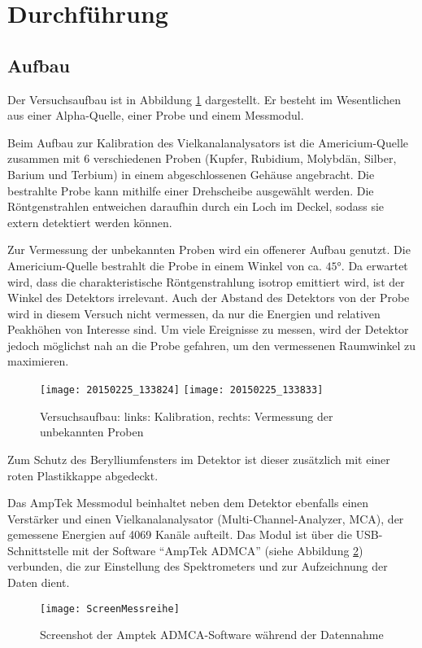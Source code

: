 \documentclass{../Misc/MontavonLaTeX/Montavon}
\newcommand{\halfwidth}{0.48\textwidth}
\newcommand{\fullwidth}{1.0\textwidth}
\begin{document}
\section{Durchführung}
\subsection{Aufbau}
Der Versuchsaufbau ist in Abbildung \ref{fig:Aufbau} dargestellt. 
Er besteht im Wesentlichen aus einer  Alpha-Quelle, einer Probe und einem Messmodul.

Beim Aufbau zur Kalibration des Vielkanalanalysators ist die Americium-Quelle zusammen mit 6 verschiedenen Proben (Kupfer, Rubidium, Molybdän, Silber, Barium und Terbium) in einem abgeschlossenen Gehäuse angebracht. Die bestrahlte Probe kann mithilfe einer Drehscheibe ausgewählt werden. Die Röntgenstrahlen entweichen daraufhin durch ein Loch im Deckel, sodass sie extern detektiert werden können.

Zur Vermessung der unbekannten Proben wird ein offenerer Aufbau genutzt. Die Americium-Quelle bestrahlt die Probe in einem Winkel von ca. $45 \unit{\degree}$. Da erwartet wird, dass die charakteristische Röntgenstrahlung isotrop emittiert wird, ist der Winkel des Detektors irrelevant. Auch der Abstand des Detektors von der Probe wird in diesem Versuch nicht vermessen, da nur die Energien und relativen Peakhöhen von Interesse sind. Um viele Ereignisse zu messen, wird der Detektor jedoch möglichst nah an die Probe gefahren, um den vermessenen Raumwinkel zu maximieren.

\begin{figure}[h]
\centering
\texttt{[image: 20150225\_133824]}
\texttt{[image: 20150225\_133833]}
\caption{Versuchsaufbau: links: Kalibration, rechts: Vermessung der unbekannten Proben}
\label{fig:Aufbau}
\end{figure}

Zum Schutz des Berylliumfensters im Detektor ist dieser zusätzlich mit einer roten Plastikkappe abgedeckt. 

Das AmpTek Messmodul beinhaltet neben dem Detektor ebenfalls einen Verstärker und einen Vielkanalanalysator (Multi-Channel-Analyzer, MCA), der gemessene Energien auf 4069 Kanäle aufteilt. Das Modul ist über die USB-Schnittstelle mit der Software \enquote{AmpTek ADMCA} (siehe Abbildung \ref{fig:ADMCA}) verbunden, die zur Einstellung des Spektrometers und zur Aufzeichnung der Daten dient.

\begin{figure}[h]
\centering
\texttt{[image: ScreenMessreihe]}
\caption{Screenshot der Amptek ADMCA-Software während der Datennahme}
\label{fig:ADMCA}
\end{figure}
\end{document}
